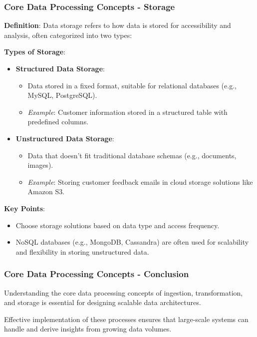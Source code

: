 \documentclass[aspectratio=169]{beamer}
\begin{document}
\begin{frame}[fragile]
    \frametitle{Core Data Processing Concepts - Storage}
    \textbf{Definition}: Data storage refers to how data is stored for accessibility and analysis, often categorized into two types:
    
    \textbf{Types of Storage}:
    \begin{itemize}
        \item \textbf{Structured Data Storage}:
        \begin{itemize}
            \item Data stored in a fixed format, suitable for relational databases (e.g., MySQL, PostgreSQL).
            \item \textit{Example}: Customer information stored in a structured table with predefined columns.
        \end{itemize}
        
        \item \textbf{Unstructured Data Storage}:
        \begin{itemize}
            \item Data that doesn't fit traditional database schemas (e.g., documents, images).
            \item \textit{Example}: Storing customer feedback emails in cloud storage solutions like Amazon S3.
        \end{itemize}
    \end{itemize}

    \textbf{Key Points}:
    \begin{itemize}
        \item Choose storage solutions based on data type and access frequency.
        \item NoSQL databases (e.g., MongoDB, Cassandra) are often used for scalability and flexibility in storing unstructured data.
    \end{itemize}
\end{frame}

\begin{frame}[fragile]
    \frametitle{Core Data Processing Concepts - Conclusion}
    Understanding the core data processing concepts of ingestion, transformation, and storage is essential for designing scalable data architectures. 
    
    Effective implementation of these processes ensures that large-scale systems can handle and derive insights from growing data volumes.
\end{frame}
\end{document}
